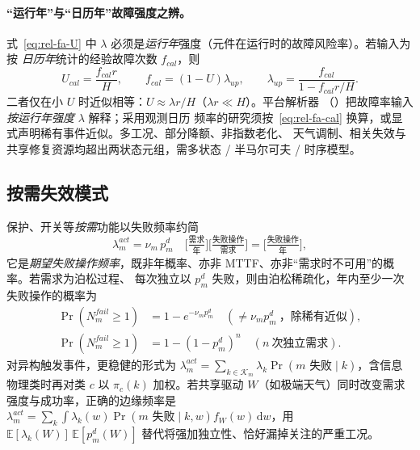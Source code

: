 \paragraph{“运行年”与“日历年”故障强度之辨。}
式~\eqref{eq:rel-fa-U} 中 $\lambda$ 必须是\emph{运行年}强度（元件在运行时的故障风险率）。若输入为按
\emph{日历年}统计的经验故障次数 $f_{cal}$，则
\begin{equation}
 U_{cal}=\frac{f_{cal}r}{H},\qquad f_{cal}=(1-U)\lambda_{up},\qquad
 \lambda_{up}=\frac{f_{cal}}{1-f_{cal}r/H}.
 \label{eq:rel-fa-cal}
\end{equation}
二者仅在小 $U$ 时近似相等：$U\approx\lambda r/H$（$\lambda r\ll H$）。平台解析器
（）把故障率输入\emph{按运行年强度} $\lambda$ 解释；采用观测日历
频率的研究须按~\eqref{eq:rel-fa-cal} 换算，或显式声明稀有事件近似。多工况、部分降额、非指数老化、
天气调制、相关失效与共享修复资源均超出两状态元组，需多状态 / 半马尔可夫 / 时序模型。

\subsection{按需失效模式}\label{sec:rel-fa-demand}
保护、开关等\emph{按需}功能以失败频率约简
\begin{equation}
 \lambda_m^{act}=\nu_m\,p_m^d\quad\Big[\tfrac{\text{需求}}{\text{年}}\Big]\Big[\tfrac{\text{失败操作}}{\text{需求}}\Big]
 =\Big[\tfrac{\text{失败操作}}{\text{年}}\Big],
 \label{eq:rel-fa-act}
\end{equation}
它是\emph{期望失败操作频率}，既非年概率、亦非 MTTF、亦非“需求时不可用”的概率。若需求为泊松过程、
每次独立以 $p_m^d$ 失败，则由泊松稀疏化，年内至少一次失败操作的概率为
\begin{equation}
\begin{aligned}
 \Pr(N_m^{fail}\ge1)&=1-e^{-\nu_m p_m^d}
   \quad(\ne\nu_m p_m^d\ \text{，除稀有近似}),\\
 \Pr(N_m^{fail}\ge1)&=1-(1-p_m^d)^n
   \quad(n\ \text{次独立需求}).
\end{aligned}
\end{equation}
对异构触发事件，更稳健的形式为
$\lambda_m^{act}=\sum_{k\in\mathcal K_m}\lambda_k\Pr(m\text{ 失败}\mid k)$，含信息物理类时再对类 $c$
以 $\pi_c(k)$ 加权。若共享驱动 $W$（如极端天气）同时改变需求强度与成功率，正确的边缘频率是
$\lambda_m^{act}=\sum_k\int\lambda_k(w)\Pr(m\text{ 失败}\mid k,w)f_W(w)\,\mathrm dw$，用
$\mathbb E[\lambda_k(W)]\,\mathbb E[p_m^d(W)]$ 替代将强加独立性、恰好漏掉关注的严重工况。

